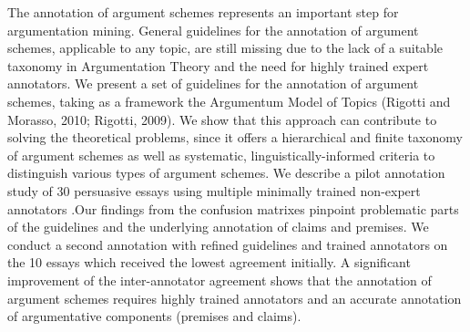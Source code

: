 The annotation of argument schemes represents an important step for argumentation mining. General guidelines for the annotation of argument schemes, applicable to any topic, are still missing due to the lack of a suitable taxonomy in Argumentation Theory and the need for highly trained expert annotators. We present a set of guidelines for the annotation of argument schemes, taking as a framework the Argumentum Model of Topics (Rigotti and Morasso, 2010; Rigotti, 2009). We show that this approach can contribute to solving the theoretical problems, since it offers a hierarchical and finite taxonomy of argument schemes as well as systematic, linguistically-informed criteria to distinguish various types of argument schemes. We describe a pilot annotation study of 30 persuasive essays using multiple minimally trained non-expert annotators .Our findings from the confusion matrixes pinpoint problematic parts of the guidelines and the underlying annotation of claims and premises. We conduct a second annotation with refined guidelines and trained annotators on the 10 essays which received the lowest agreement initially. A significant improvement of the inter-annotator agreement shows that the annotation of argument schemes requires highly trained annotators and an accurate annotation of argumentative components (premises and claims).
